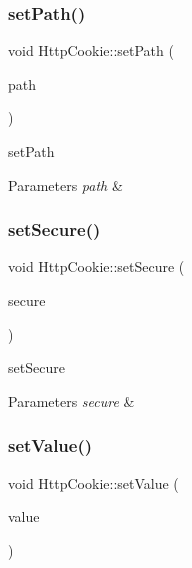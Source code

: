 \subsubsection{\texorpdfstring{set\+Path()}{setPath()}}
{\footnotesize\ttfamily void Http\+Cookie\+::set\+Path (\begin{DoxyParamCaption}\item[{const Q\+Byte\+Array \&}]{path }\end{DoxyParamCaption})}



set\+Path 


\begin{DoxyParams}{Parameters}
{\em path} & \\
\hline
\end{DoxyParams}
\mbox{\label{class_http_cookie_ab96aa1b1dd995c05fc0e092e1fb7b1e3}} 
\subsubsection{\texorpdfstring{set\+Secure()}{setSecure()}}
{\footnotesize\ttfamily void Http\+Cookie\+::set\+Secure (\begin{DoxyParamCaption}\item[{bool}]{secure }\end{DoxyParamCaption})}



set\+Secure 


\begin{DoxyParams}{Parameters}
{\em secure} & \\
\hline
\end{DoxyParams}
\mbox{\label{class_http_cookie_a2f38c00473e7628a708eae2dd0cd51f0}} 
\subsubsection{\texorpdfstring{set\+Value()}{setValue()}}
{\footnotesize\ttfamily void Http\+Cookie\+::set\+Value (\begin{DoxyParamCaption}\item[{const Q\+Byte\+Array \&}]{value }\end{DoxyParamCaption})}



